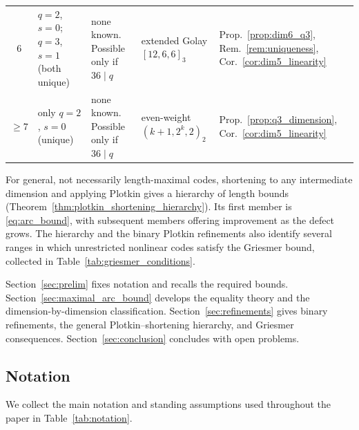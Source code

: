 \documentclass[12pt, letterpaper]{article}
\theoremstyle{plain}
\theoremstyle{definition}
\begin{document}
\begin{table}[htbp]
\begin{tabular}{@{}c >{\raggedright\arraybackslash}p{1.4in} >{\raggedright\arraybackslash}p{1.7in} >{\raggedright\arraybackslash}p{1.35in} >{\raggedright\arraybackslash}p{1in}@{}}
			$6$ & $q{=}2$, $s{=}0$; $q{=}3$, $s{=}1$ (both unique) & none known. Possible only if $36\mid q$ & extended Golay $[12,6,6]_3$ & Prop.~\ref{prop:dim6_q3}, Rem.~\ref{rem:uniqueness}, Cor.~\ref{cor:dim5_linearity} \\
			$\ge 7$ & only $q{=}2$, $s{=}0$ (unique) & none known. Possible only if $36\mid q$ & even-weight $(k{+}1,2^k,2)_2$ & Prop.~\ref{prop:q3_dimension}, Cor.~\ref{cor:dim5_linearity} \\
			\bottomrule
		\end{tabular}
	\end{table}

	For general, not necessarily length-maximal codes, shortening to any intermediate dimension and applying Plotkin gives a hierarchy of length bounds (Theorem~\ref{thm:plotkin_shortening_hierarchy}). Its first member is \eqref{eq:arc_bound}, with subsequent members offering improvement as the defect grows. The hierarchy and the binary Plotkin refinements also identify several ranges in which unrestricted nonlinear codes satisfy the Griesmer bound, collected in Table~\ref{tab:griesmer_conditions}.
	
Section~\ref{sec:prelim} fixes notation and recalls the required bounds. Section~\ref{sec:maximal_arc_bound} develops the equality theory and the dimension-by-dimension classification. Section~\ref{sec:refinements} gives binary refinements, the general Plotkin--shortening hierarchy, and Griesmer consequences. Section~\ref{sec:conclusion} concludes with open problems.

\subsection{Notation}

We collect the main notation and standing assumptions used throughout the paper in Table~\ref{tab:notation}.
\end{document}

